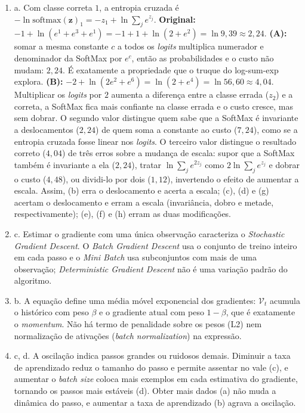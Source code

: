 \documentclass{dlproblemset}
\begin{document}
\begin{enumerate}[1)]
    \item a. Com classe correta $1$, a entropia cruzada é $-\ln \mathrm{softmax}(\mathbf{z})_1 = -z_1 + \ln\sum_j e^{z_j}$. \textbf{Original:} $-1 + \ln(e^1 + e^3 + e^1) = -1 + 1 + \ln(2 + e^{2}) = \ln 9{,}39 \approx 2{,}24$. \textbf{(A):} somar a mesma constante $c$ a todos os \textit{logits} multiplica numerador e denominador da SoftMax por $e^{c}$, então as probabilidades e o custo não mudam: $2{,}24$. É exatamente a propriedade que o truque do log-sum-exp explora. \textbf{(B):} $-2 + \ln(2e^{2} + e^{6}) = \ln(2 + e^{4}) = \ln 56{,}60 \approx 4{,}04$. Multiplicar os \textit{logits} por $2$ aumenta a diferença entre a classe errada ($z_2$) e a correta, a SoftMax fica mais confiante na classe errada e o custo cresce, mas sem dobrar. O segundo valor distingue quem sabe que a SoftMax é invariante a deslocamentos ($2{,}24$) de quem soma a constante ao custo ($7{,}24$), como se a entropia cruzada fosse linear nos \textit{logits}. O terceiro valor distingue o resultado correto ($4{,}04$) de três erros sobre a mudança de escala: supor que a SoftMax também é invariante a ela ($2{,}24$), tratar $\ln\sum_j e^{2z_j}$ como $2\ln\sum_j e^{z_j}$ e dobrar o custo ($4{,}48$), ou dividi-lo por dois ($1{,}12$), invertendo o efeito de aumentar a escala. Assim, (b) erra o deslocamento e acerta a escala; (c), (d) e (g) acertam o deslocamento e erram a escala (invariância, dobro e metade, respectivamente); (e), (f) e (h) erram as duas modificações.

    \item c. Estimar o gradiente com uma única observação caracteriza o \textit{Stochastic Gradient Descent}. O \textit{Batch Gradient Descent} usa o conjunto de treino inteiro em cada passo e o \textit{Mini Batch} usa subconjuntos com mais de uma observação; \textit{Deterministic Gradient Descent} não é uma variação padrão do algoritmo.

    \item b. A equação define uma média móvel exponencial dos gradientes: $\mathcal{V}_t$ acumula o histórico com peso $\beta$ e o gradiente atual com peso $1-\beta$, que é exatamente o \textit{momentum}. Não há termo de penalidade sobre os pesos (L2) nem normalização de ativações (\textit{batch normalization}) na expressão.

    \item c, d. A oscilação indica passos grandes ou ruidosos demais. Diminuir a taxa de aprendizado reduz o tamanho do passo e permite assentar no vale (c), e aumentar o \textit{batch size} coloca mais exemplos em cada estimativa do gradiente, tornando os passos mais estáveis (d). Obter mais dados (a) não muda a dinâmica do passo, e aumentar a taxa de aprendizado (b) agrava a oscilação.


\end{enumerate}
\end{document}
